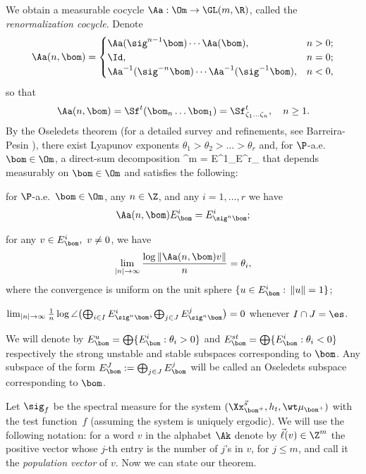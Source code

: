 We obtain a measurable cocycle $\Aa: \Om\to \GL(m,\R)$, called the \emph{renormalization cocycle}. Denote\vspace*{-3pt}
\begin{equation}\label{renormcoc}
\Aa(n,\bom) = \begin{cases} \Aa(\sig^{n-1}\bom)\cdots \Aa(\bom), & n> 0; \\
\Id, & n=0; \\
\Aa^{-1}(\sig^{-n}\bom) \cdots \Aa^{-1}(\sig^{-1}\bom), & n<0,\end{cases}
\end{equation}
so that\vspace*{-3pt}
\[
\Aa(n,\bom) = \Sf^t(\bom_n\ldots \bom_1)= \Sf^t_{\zeta_1\ldots\zeta_n},\quad n\ge 1.\]
By the Oseledets theorem \cite{oseledets} (for a detailed survey and refinements, see Barreira-Pesin \cite[Th.\,3.5.5]{barpes}),
there exist Lyapunov exponents $\theta_1> \theta_2 > \ldots > \theta_r$ and, for $\P$-a.e.\ $\bom\in \Om$, a direct-sum decomposition\vspace*{-3pt}
\be \label{os1}
\R^m = E^1_\bom \oplus \cdots \oplus E^r_\bom
\ee
that depends measurably on $\bom\in \Om$ and satisfies the following:
\begin{enumeratei}
\item\label{sec:3i}
for $\P$-a.e.\ $\bom\in \Om$, any $n\in\Z$, and any $i=1,\ldots,r$ we have
\[
\Aa(n,\bom) E^i_\bom = E^i_{\sig^n\bom};
\]

\item\label{sec:3ii}
for any $v\in E^i_\bom,\ v\ne 0$, we have
\[
\lim_{|n|\to \infty} \frac{\log\|\Aa(n,\bom)v\|}{n} = \theta_i,
\]
where the convergence is uniform on the unit sphere $\{u\in E^i_\bom:\, \|u\|=1\}$;

\item\label{sec:3iii}
$\lim_{|n|\to \infty} \frac{1}{n}\log\angle\bigl(\bigoplus_{i\in I} E^i_{\sig^n\bom}, \bigoplus_{j\in J} E^j_{\sig^n \bom} \bigr) =0$ whenever $I\cap J = \es$.
\end{enumeratei}

We will denote by $E_\bom^{u}=\bigoplus\{E^i_\bom:\theta_i>0\}$ and $E_\bom^{st}=\bigoplus\{E^i_\bom:\theta_i<0\}$ respectively the strong unstable and stable subspaces corresponding to $\bom$. Any subspace of the form $E_\bom^J:=\bigoplus_{j\in J} E^j_\bom$ will be called an Oseledets subspace corresponding to $\bom$.

Let $\sig_f$ be the spectral measure for the system $(\Xx_{\bom^+}^{\vec{s}},h_t,\wt\mu_{\bom^+})$ with the test function~$f$ (assuming the system is uniquely ergodic).
We will use the following notation: for a word $v$ in the alphabet $\Ak$ denote by $\vec{\ell}(v)\in \Z^m$ the positive vector whose $j$-th entry is the number of $j$'s in $v$, for $j\le m$,
and call it the \emph{population vector} of $v$.
Now we can state our theorem.

